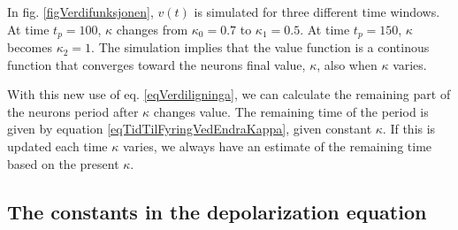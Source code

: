 

In fig. \ref{figVerdifunksjonen}, $v(t)$ is simulated for three different time windows. At time $t_p=100$, $\kappa$ changes from $\kappa_0=0.7$ to $\kappa_1=0.5$. At time $t_p=150$, $\kappa$ becomes $\kappa_2=1$. 
The simulation implies that the value function is a continous function that converges toward the neurons final value, $\kappa$, also when $\kappa$ varies.


With this new use of eq. \eqref{eqVerdiligninga}, we can calculate the remaining part of the neurons period after $\kappa$ changes value. 
The remaining time of the period is given by equation \eqref{eqTidTilFyringVedEndraKappa}, given constant $\kappa$. 
If this is updated each time $\kappa$ varies, we always have an estimate of the remaining time based on the present $\kappa$.





\subsection{The constants in the depolarization equation}
\label{ssecValueOfAlpha}

